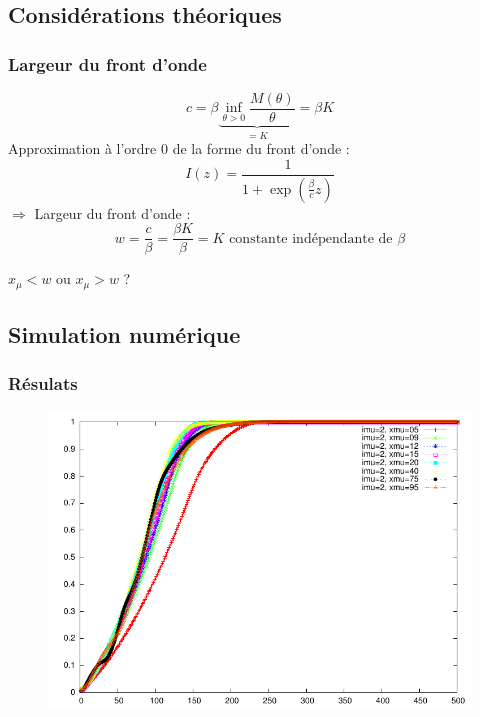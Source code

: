 \documentclass[handout]{beamer}
\begin{document}
\subsection[Théorique]{Considérations théoriques}
\begin{frame}
	\frametitle{Largeur du front d'onde}
\begin{equation}
	c=\beta\underbrace{\inf_{\theta>0} \frac{M(\theta)}{\theta} }_{=K}= \beta K
\end{equation}
Approximation à l'ordre 0 de la forme du front d'onde :
\begin{equation}
	I(z)=\frac{1}{1+\exp\left(\frac{\beta}{c}z\right)}
\end{equation}
$\Rightarrow$ Largeur du front d'onde :
\begin{equation}
	w=\frac{c}{\beta}=\frac{\beta K}{\beta}=K \text{ constante indépendante de }\beta
\end{equation}
\begin{center}$x_{\mu}<w$ ou $x_{\mu}>w$ ? \end{center}
\end{frame}

\subsection[Numérique]{Simulation numérique}
\begin{frame}
	\frametitle{Résulats}
\begin{figure}[!h]
\centering
	\includegraphics[scale=0.75]{img/plot2.pdf}
\end{figure}
\end{frame}
\end{document}
